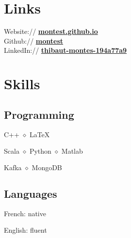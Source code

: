\documentclass[]{deedy-resume-openfont}
\begin{document}
\begin{minipage}[t]{0.33\textwidth}

\vspace{\topsep}
\vspace{\topsep}
\section{Links} 
Website:// \href{https://montest.github.io}{\bf montest.github.io} \\
Github:// \href{https://github.com/montest}{\bf montest} \\
LinkedIn:// \href{https://www.linkedin.com/in/thibaut-montes-194a77a9}{\bf thibaut-montes-194a77a9}


\vspace{\topsep}
\vspace{\topsep}
\section{Skills}

\subsection{Programming}
\vspace{\topsep}
\begin{tightemize}
\item {}
C++ $\diamond$ \LaTeX \\
\item {}
Scala $\diamond$ Python $\diamond$ Matlab \\
\item {}
Kafka $\diamond$ MongoDB
\end{tightemize}

\sectionsep
\subsection{Languages}
\vspace{\topsep}
\begin{tightemize}
\item French: native
\item English: fluent
\end{tightemize}


\end{minipage}
\end{document}
